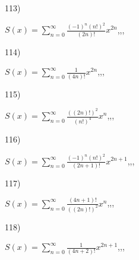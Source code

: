 \documentclass[11pt, ukrainian]{article}
\begin{document}
\par
\vspace{0.9cm}
113) \space 
{%
{$S(x)=\sum\limits_{n=0}^{\infty}{\frac{{(-1)^n}{(n!)^2}}{(2n)!}}{x^{{2n}}}$},,, \par \smallskip  
}
\par
\vspace{0.9cm}
114) \space 
{%
{$S(x)=\sum\limits_{n=0}^{\infty}{\frac{1}{(4n)!}}{x^{{2n}}}$},,, \par \smallskip  
}
\par
\vspace{0.9cm}
115) \space 
{%
{$S(x)=\sum\limits_{n=0}^{\infty}{\frac{((2n)!)^2}{(n!)^4}}{x^{{n}}}$},,, \par \smallskip  
}
\par
\vspace{0.9cm}
116) \space 
{%
{$S(x)=\sum\limits_{n=0}^{\infty}{\frac{{(-1)^n}{(n!)^2}}{(2n+1)!}}{x^{{2n+1}}}$},,, \par \smallskip  
}
\par
\vspace{0.9cm}
117) \space 
{%
{$S(x)=\sum\limits_{n=0}^{\infty}{\frac{(4n+1)!}{((2n)!)^2}}{x^{{n}}}$},,, \par \smallskip  
}
\par
\vspace{0.9cm}
118) \space 
{%
{$S(x)=\sum\limits_{n=0}^{\infty}{\frac{1}{(4n+2)!}}{x^{{2n+1}}}$},,, \par \smallskip  
}
\end{document}
